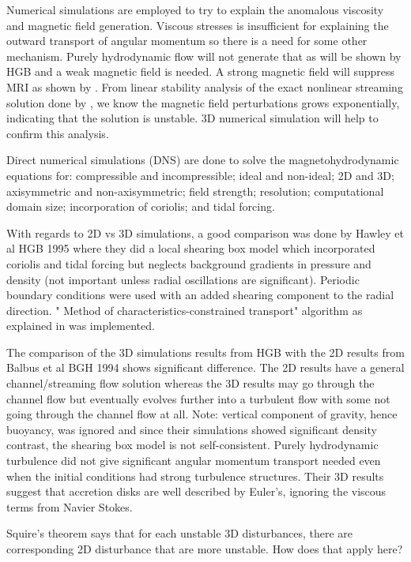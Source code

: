 \documentclass{jfm}
\begin{document}
Numerical simulations are employed to try to explain the anomalous viscosity and magnetic field generation. Viscous stresses is insufficient for explaining the outward transport of angular momentum so there is a need for some other mechanism. Purely hydrodynamic flow will not generate that as will be shown by HGB and a weak magnetic field is needed. A strong magnetic field will suppress MRI as shown by \cite{Liu2008}. From linear stability analysis of the exact nonlinear streaming solution done by \cite{Goodman1994}, we know the magnetic field perturbations grows exponentially, indicating that the solution is unstable. 3D numerical simulation will help to confirm this analysis.

Direct numerical simulations (DNS) are done to solve the magnetohydrodynamic equations for: compressible and incompressible; ideal and non-ideal; 2D and 3D; axisymmetric and non-axisymmetric; field strength; resolution; computational domain size; incorporation of coriolis; and tidal forcing.

With regards to 2D vs 3D simulations, a good comparison was done by Hawley et al HGB 1995 where they did a local shearing box model which incorporated coriolis and tidal forcing but neglects background gradients in pressure and density (not important unless radial oscillations are significant). Periodic boundary conditions were used with an added shearing component to the radial direction. " Method of characteristics-constrained transport" algorithm as explained in \cite{Hawley1995} was implemented.

The comparison of the 3D simulations results from HGB with the 2D results from Balbus et al BGH 1994 shows significant difference. The 2D results have a general channel/streaming flow solution whereas the 3D results may go through the channel flow but eventually evolves further into a turbulent flow with some not going through the channel flow at all. Note: vertical component of gravity, hence buoyancy, was  ignored and since their simulations showed significant density contrast, the shearing box model is not self-consistent. Purely hydrodynamic turbulence did not give significant angular momentum transport needed even when the initial conditions had strong turbulence structures. Their 3D results suggest that accretion disks are well described by Euler's, ignoring the viscous terms from Navier Stokes.

Squire's theorem says that for each unstable 3D disturbances, there are corresponding 2D disturbance that are more unstable. How does that apply here?
\end{document}
